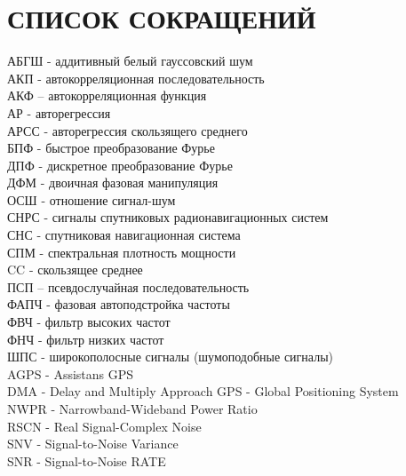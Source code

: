 \section*{СПИСОК СОКРАЩЕНИЙ}
\noindent
АБГШ - аддитивный белый гауссовский шум				\\
АКП - автокорреляционная последовательность			\\
АКФ – автокорреляционная функция				\\
АР - авторегрессия						\\
АРСС - авторегрессия скользящего среднего			\\
БПФ - быстрое преобразование Фурье				\\
ДПФ - дискретное преобразование Фурье				\\
ДФМ - двоичная фазовая манипуляция				\\
ОСШ - отношение сигнал-шум 					\\
СНРС - сигналы спутниковых радионавигационных систем		\\
СНС - спутниковая навигационная система				\\
СПМ - спектральная плотность мощности				\\
CC - скользящее среднее						\\
ПСП – псевдослучайная последовательность			\\
ФАПЧ - фазовая автоподстройка частоты				\\
ФВЧ - фильтр высоких частот					\\
ФНЧ - фильтр низких частот					\\
ШПС -  широкополосные сигналы (шумоподобные сигналы)		\\

\noindent
AGPS - Assistans GPS						\\
DMA - Delay and Multiply Approach
GPS - Global Positioning System					\\
NWPR - Narrowband-Wideband Power Ratio				\\
RSCN - Real Signal-Complex Noise				\\
SNV - Signal-to-Noise Variance					\\
SNR - Signal-to-Noise RATE					\\

\newpage
